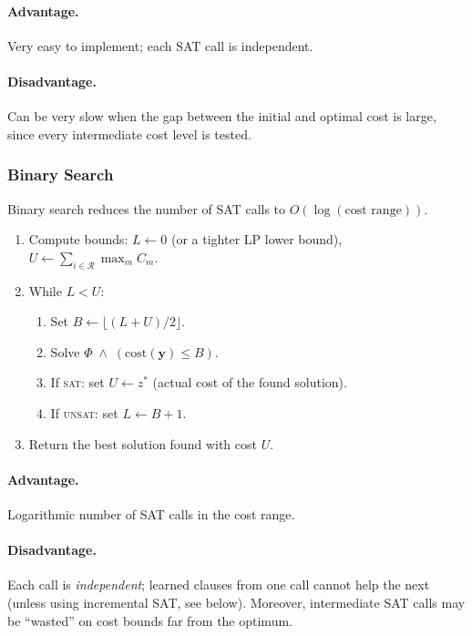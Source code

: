 \documentclass[11pt,a4paper]{article}
\newcommand{\setR}{\mathcal{R}}
\begin{document}
\paragraph{Advantage.}
Very easy to implement; each SAT call is independent.

\paragraph{Disadvantage.}
Can be very slow when the gap between the initial and optimal cost
is large, since every intermediate cost level is tested.

\subsubsection{Binary Search}
\label{sec:opt-binary}

Binary search reduces the number of SAT calls to
$O(\log(\text{cost range}))$.

\begin{enumerate}
  \item Compute bounds:
        $L \leftarrow 0$ (or a tighter LP lower bound),
        $U \leftarrow \sum_{i \in \setR} \max_{m} C_m$.
  \item While $L < U$:
    \begin{enumerate}
      \item Set $B \leftarrow \lfloor (L + U) / 2 \rfloor$.
      \item Solve $\Phi \;\land\; (\mathrm{cost}(\mathbf{y}) \le B)$.
      \item If \textsc{sat}: set $U \leftarrow z^{*}$
            (actual cost of the found solution).
      \item If \textsc{unsat}: set $L \leftarrow B + 1$.
    \end{enumerate}
  \item Return the best solution found with cost $U$.
\end{enumerate}

\paragraph{Advantage.}
Logarithmic number of SAT calls in the cost range.

\paragraph{Disadvantage.}
Each call is \emph{independent}; learned clauses from one call
cannot help the next (unless using incremental SAT, see below).
Moreover, intermediate SAT calls may be ``wasted'' on
cost bounds far from the optimum.
\end{document}
